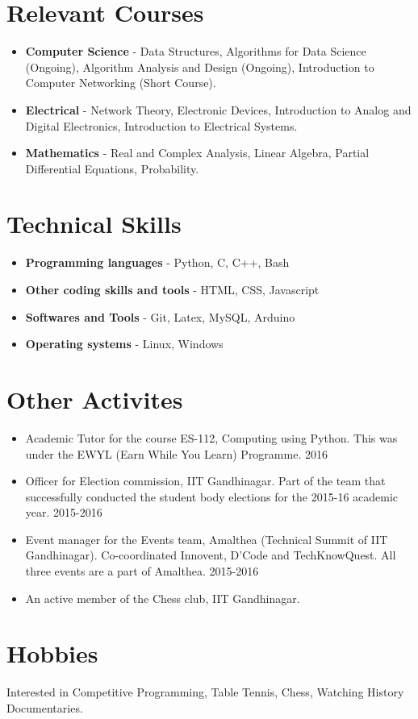 \documentclass[margin, centered]{res}
\begin{document}
\begin{resume}
\section{Relevant Courses}
\begin{itemize}[leftmargin=*]
\item {\bf Computer Science} - Data Structures, Algorithms for Data Science (Ongoing), Algorithm Analysis and Design (Ongoing), Introduction to Computer Networking (Short Course).
\item {\bf Electrical} - Network Theory, Electronic Devices, Introduction to Analog and Digital Electronics, Introduction to Electrical Systems.
\item {\bf Mathematics} - Real and Complex Analysis, Linear Algebra, Partial Differential Equations, Probability.
\end{itemize}

\section{Technical Skills}
\begin{itemize}[leftmargin=*]
\item {\bf Programming languages} - Python, C, C++, Bash
\item {\bf Other coding skills and tools} - HTML, CSS, Javascript
\item {\bf Softwares and Tools} - Git, Latex, MySQL, Arduino
\item {\bf Operating systems} - Linux, Windows
\end{itemize}

\section{Other Activites}
\begin{itemize}[leftmargin=*]
\item Academic Tutor for the course ES-112, Computing using Python. This was under the EWYL (Earn While You Learn) Programme. 
\hfill {2016}
\item Officer for Election commission, IIT Gandhinagar. Part of the team that successfully conducted the student body elections for the 2015-16 academic year.
\hfill{2015-2016}
\item Event manager for the Events team, Amalthea (Technical Summit of IIT Gandhinagar). Co-coordinated Innovent, D’Code and TechKnowQuest. All three events are a part of Amalthea.
\hfill{2015-2016}
\item An active member of the Chess club, IIT Gandhinagar.
\end{itemize}

\section{Hobbies}Interested in Competitive Programming, Table Tennis, Chess, Watching History Documentaries.

\end{resume}
\end{document}
